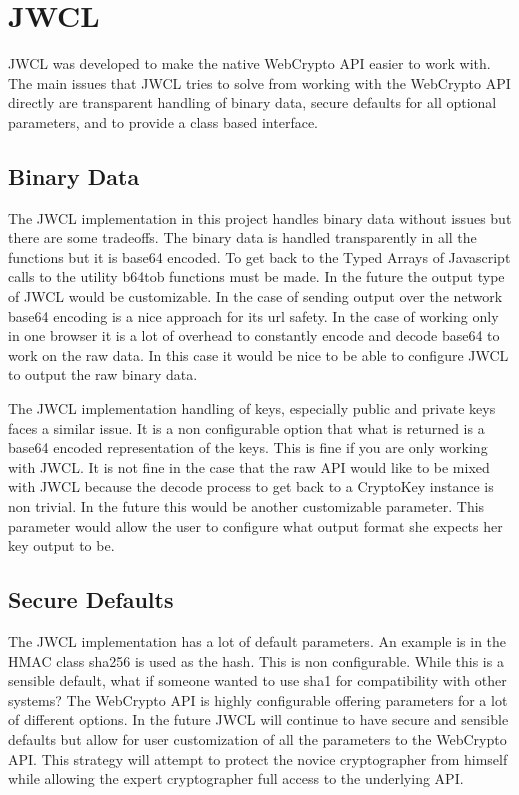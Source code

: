 \section{JWCL}


JWCL was developed to make the native WebCrypto API easier to work with. The main issues that JWCL tries to solve from working with the WebCrypto API directly are transparent handling of binary data, secure defaults for all optional parameters, and to provide a class based interface.


\subsection{Binary Data}


The JWCL implementation in this project handles binary data without issues but there are some tradeoffs. The binary data is handled transparently in all the functions but it is base64 encoded. To get back to the Typed Arrays of Javascript calls to the utility b64tob functions must be made. In the future the output type of JWCL would be customizable. In the case of sending output over the network base64 encoding is a nice approach for its url safety. In the case of working only in one browser it is a lot of overhead to constantly encode and decode base64 to work on the raw data. In this case it would be nice to be able to configure JWCL to output the raw binary data.


The JWCL implementation handling of keys, especially public and private keys faces a similar issue. It is a non configurable option that what is returned is a base64 encoded representation of the keys. This is fine if you are only working with JWCL. It is not fine in the case that the raw API would like to be mixed with JWCL because the decode process to get back to a CryptoKey instance is non trivial. In the future this would be another customizable parameter. This parameter would allow the user to configure what output format she expects her key output to be. 


\subsection{Secure Defaults}


The JWCL implementation has a lot of default parameters. An example is in the HMAC class sha256 is used as the hash. This is non configurable. While this is a sensible default, what if someone wanted to use sha1 for compatibility with other systems? The WebCrypto API is highly configurable offering parameters for a lot of different options. In the future JWCL will continue to have secure and sensible defaults but allow for user customization of all the parameters to the WebCrypto API. This strategy will attempt to protect the novice cryptographer from himself while allowing the expert cryptographer full access to the underlying API.


